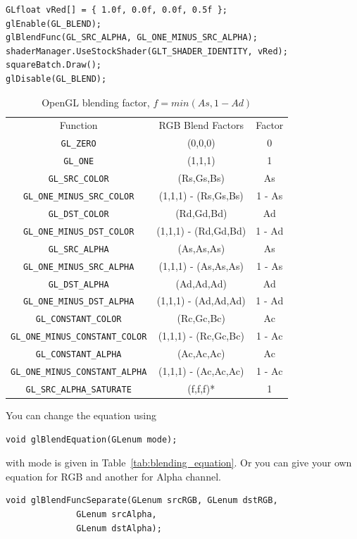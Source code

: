 \begin{verbatim}
GLfloat vRed[] = { 1.0f, 0.0f, 0.0f, 0.5f };
glEnable(GL_BLEND);
glBlendFunc(GL_SRC_ALPHA, GL_ONE_MINUS_SRC_ALPHA);
shaderManager.UseStockShader(GLT_SHADER_IDENTITY, vRed);
squareBatch.Draw();
glDisable(GL_BLEND);
\end{verbatim}

\begin{table}[hbt]
  \begin{center}
    \caption{OpenGL blending factor, $f = min(As, 1-Ad)$}
    \begin{tabular}{ccc} 
      \hline
      Function & RGB Blend Factors & Factor \\
      \verb!GL_ZERO! & (0,0,0) &  0 \\
      \verb!GL_ONE!& (1,1,1) & 1 \\
      \verb!GL_SRC_COLOR! & (Rs,Gs,Bs) & As \\
      \verb!GL_ONE_MINUS_SRC_COLOR! & (1,1,1) - (Rs,Gs,Bs) & 1 - As \\
      \verb!GL_DST_COLOR! & (Rd,Gd,Bd) & Ad \\
      \verb!GL_ONE_MINUS_DST_COLOR! & (1,1,1) - (Rd,Gd,Bd) & 1 - Ad \\
      \verb!GL_SRC_ALPHA! & (As,As,As) & As \\
      \verb!GL_ONE_MINUS_SRC_ALPHA! & (1,1,1) - (As,As,As) & 1 - As \\
      \verb!GL_DST_ALPHA! & (Ad,Ad,Ad) & Ad \\
      \verb!GL_ONE_MINUS_DST_ALPHA! & (1,1,1) - (Ad,Ad,Ad) & 1 - Ad  \\
      \verb!GL_CONSTANT_COLOR! & (Rc,Gc,Bc) & Ac \\
      \verb!GL_ONE_MINUS_CONSTANT_COLOR! & (1,1,1) - (Rc,Gc,Bc) & 1 - Ac \\
      \verb!GL_CONSTANT_ALPHA! & (Ac,Ac,Ac) & Ac \\
      \verb!GL_ONE_MINUS_CONSTANT_ALPHA! & (1,1,1) - (Ac,Ac,Ac) & 1 - Ac \\
      \verb!GL_SRC_ALPHA_SATURATE! & (f,f,f)* & 1 \\
      \hline\hline
    \end{tabular}
  \end{center}
  \label{tab:blending_factor}
\end{table}

You can change the equation using
\begin{verbatim}
void glBlendEquation(GLenum mode);
\end{verbatim}
with mode is given in Table~\ref{tab:blending_equation}. Or you can
give your own equation for RGB and another for Alpha channel.
\begin{verbatim}
void glBlendFuncSeparate(GLenum srcRGB, GLenum dstRGB, 
              GLenum srcAlpha, 
              GLenum dstAlpha);
\end{verbatim}



